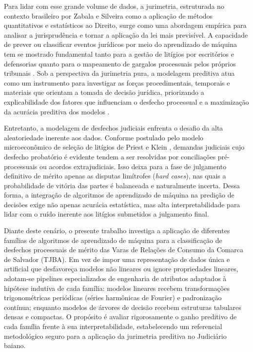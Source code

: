 \documentclass[conference]{IEEEtran}
\begin{document}
Para lidar com esse grande volume de dados, a jurimetria, estruturada no contexto brasileiro por Zabala e Silveira \cite{zabala2014} como a aplicação de métodos quantitativos e estatísticos ao Direito, surge como uma abordagem empírica para analisar a jurisprudência e tornar a aplicação da lei mais previsível. A capacidade de prever ou classificar eventos jurídicos por meio do aprendizado de máquina tem se mostrado fundamental tanto para a gestão de litígios por escritórios e defensorias quanto para o mapeamento de gargalos processuais pelos próprios tribunais \cite{aletras2016, katz2017}. Sob a perspectiva da jurimetria pura, a modelagem preditiva atua como um instrumento para investigar as forças procedimentais, temporais e materiais que orientam a tomada de decisão jurídica, priorizando a explicabilidade dos fatores que influenciam o desfecho processual e a maximização da acurácia preditiva dos modelos \cite{izbicki2020}.

Entretanto, a modelagem de desfechos judiciais enfrenta o desafio da alta aleatoriedade inerente aos dados. Conforme postulado pelo modelo microeconômico de seleção de litígios de Priest e Klein \cite{priest1984, trecenti2021}, demandas judiciais cujo desfecho probatório é evidente tendem a ser resolvidas por conciliações pré-processuais ou acordos extrajudiciais. Isso deixa para a fase de julgamento definitivo de mérito apenas as disputas limítrofes (\textit{hard cases}), nas quais a probabilidade de vitória das partes é balanceada e naturalmente incerta. Dessa forma, a integração de algoritmos de aprendizado de máquina na predição de decisões exige não apenas acurácia estatística, mas alta interpretabilidade para lidar com o ruído inerente aos litígios submetidos a julgamento final.

Diante deste cenário, o presente trabalho investiga a aplicação de diferentes famílias de algoritmos de aprendizado de máquina para a classificação de desfechos processuais de mérito das Varas de Relações de Consumo da Comarca de Salvador (TJBA). Em vez de impor uma representação de dados única e artificial que desfavoreça modelos não lineares ou ignore propriedades lineares, adotam-se pipelines especializados de engenharia de atributos adaptados à hipótese indutiva de cada família: modelos lineares recebem transformações trigonométricas periódicas (séries harmônicas de Fourier) e padronização contínua; enquanto modelos de árvores de decisão recebem estruturas tabulares densas e compactas. O propósito é avaliar rigorosamente o ganho preditivo de cada família frente à sua interpretabilidade, estabelecendo um referencial metodológico seguro para a aplicação da jurimetria preditiva no Judiciário baiano.
\end{document}

